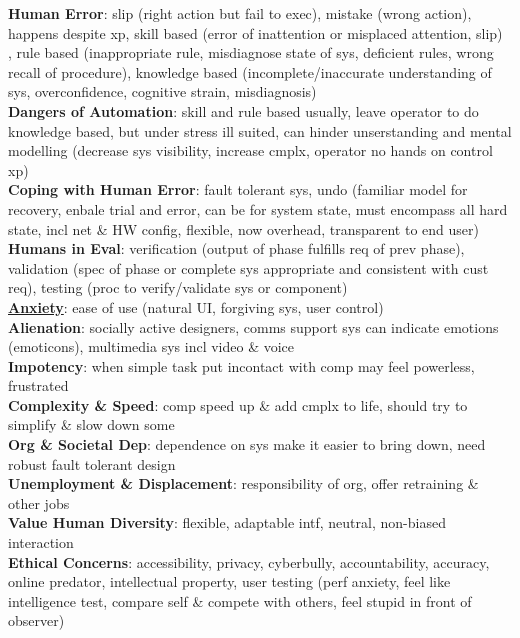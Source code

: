 \documentclass[a4paper]{article}
\begin{document}
\begin{multicols}{3}
        \textbf{Human Error}: slip (right action but fail to exec), mistake (wrong action), happens despite xp, skill based (error of inattention or misplaced attention, slip)\\, rule based (inappropriate rule, misdiagnose state of sys, deficient rules, wrong recall of procedure), knowledge based (incomplete/inaccurate understanding of sys, overconfidence, cognitive strain, misdiagnosis)\\
        \textbf{Dangers of Automation}: skill and rule based usually, leave operator to do knowledge based, but under stress ill suited, can hinder unserstanding and mental modelling (decrease sys visibility, increase cmplx, operator no hands on control xp)\\
        \textbf{Coping with Human Error}: fault tolerant sys, undo (familiar model for recovery, enbale trial and error, can be for system state, must encompass all hard state, incl net \& HW config, flexible, now overhead, transparent to end user)\\
        \textbf{Humans in Eval}: verification (output of phase fulfills req of prev phase), validation (spec of phase or complete sys appropriate and consistent with cust req), testing (proc to verify/validate sys or component)\\
        \underline{\textbf{Anxiety}}: ease of use (natural UI, forgiving sys, user control)\\
        \textbf{Alienation}: socially active designers, comms support sys can indicate emotions (emoticons), multimedia sys incl video \& voice\\
        \textbf{Impotency}: when simple task put incontact with comp may feel powerless, frustrated\\
        \textbf{Complexity \& Speed}: comp speed up \& add cmplx to life, should try to simplify \& slow down some\\
        \textbf{Org \& Societal Dep}: dependence on sys make it easier to bring down, need robust fault tolerant design\\
        \textbf{Unemployment \& Displacement}: responsibility of org, offer retraining \& other jobs\\
        \textbf{Value Human Diversity}: flexible, adaptable intf, neutral, non-biased interaction\\
        \textbf{Ethical Concerns}: accessibility, privacy, cyberbully, accountability, accuracy, online predator, intellectual property, user testing (perf anxiety, feel like intelligence test, compare self \& compete with others, feel stupid in front of observer)\\
    \end{multicols}
    
\end{document}
